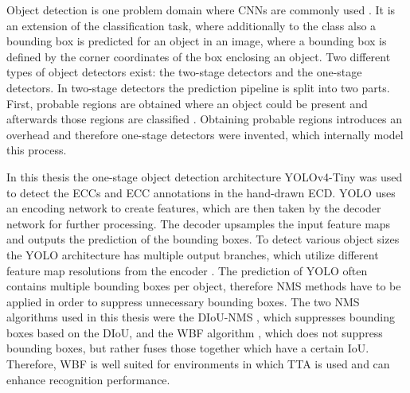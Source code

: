 Object detection is one problem domain where \acp{CNN} are commonly used \cite{yolov1}.
It is an extension of the classification task, where additionally to the class also a bounding box is predicted for an object in an image, where a bounding box is defined by the corner coordinates of the box enclosing an object.
Two different types of object detectors exist: the two-stage detectors and the one-stage detectors.
In two-stage detectors the prediction pipeline is split into two parts.
First, probable regions are obtained where an object could be present and afterwards those regions are classified \cite{rcnn}.
Obtaining probable regions introduces an overhead and therefore one-stage detectors were invented, which internally model this process.

In this thesis the one-stage object detection architecture \ac{YOLO}v4-Tiny \cite{yolov4_tiny} was used to detect the \acp{ECC} and \ac{ECC} annotations in the hand-drawn \ac{ECD}.
\ac{YOLO} uses an encoding network to create features, which are then taken by the decoder network for further processing.
The decoder upsamples the input feature maps and outputs the prediction of the bounding boxes.
To detect various object sizes the \ac{YOLO} architecture has multiple output branches, which utilize different feature map resolutions from the encoder \cite{fpn}.
The prediction of \ac{YOLO} often contains multiple bounding boxes per object, therefore \ac{NMS} methods have to be applied in order to suppress unnecessary bounding boxes.
The two \ac{NMS} algorithms used in this thesis were the \ac{DIoU}-\ac{NMS} \cite{diou}, which suppresses bounding boxes based on the \ac{DIoU}, and the \ac{WBF} algorithm \cite{weighted_bbox_fusion}, which does not suppress bounding boxes, but rather fuses those together which have a certain \ac{IoU}.
Therefore, \ac{WBF} is well suited for environments in which \ac{TTA} is used and can enhance recognition performance.

